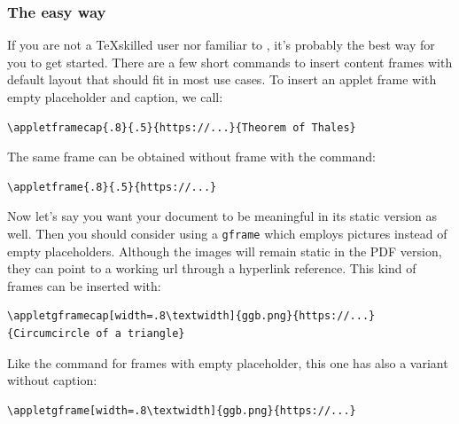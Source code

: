 \documentclass[10pt,a4paper]{article}
\begin{document}
\subsubsection{The easy way}
If you are not a \TeX skilled user nor familiar to \intex, it's probably the best way for you to get started. There are a few short commands to insert content frames with default layout that should fit in most use cases.
To insert an applet frame with empty placeholder and caption, we call:
\begin{lstlisting}[caption=Frame with empty placeholder and caption,frame=single,label=lst:emp]
\appletframecap{.8}{.5}{https://...}{Theorem of Thales}
\end{lstlisting}
The same frame can be obtained without frame with the command:
\begin{lstlisting}[caption=Frame with empty placeholder and no caption, frame=single]
\appletframe{.8}{.5}{https://...}
\end{lstlisting}
Now let's say you want your document to be meaningful in its static version as well. Then you should consider using a \verb|gframe| which employs pictures instead of empty placeholders. Although the images will remain static in the PDF version, they can point to a working url through a hyperlink reference. This kind of frames can be inserted with:
\begin{lstlisting}[caption=Frame with image placeholder and caption,frame=single,label=lst:graph]
\appletgframecap[width=.8\textwidth]{ggb.png}{https://...}
{Circumcircle of a triangle}
\end{lstlisting}
Like the command for frames with empty placeholder, this one has also a variant without caption:
\begin{lstlisting}[caption=Frame with image placeholder and no caption,frame=single]
\appletgframe[width=.8\textwidth]{ggb.png}{https://...}
\end{lstlisting}
\end{document}
